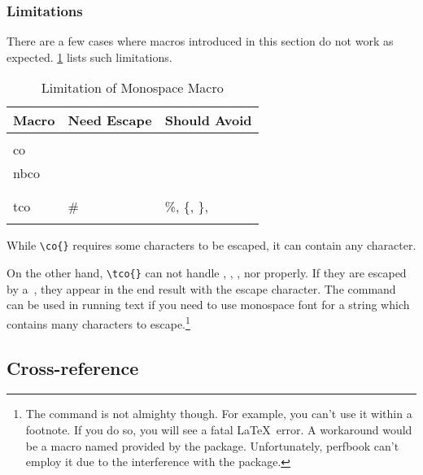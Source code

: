 \subsubsection{Limitations}
\label{sec:app:styleguide:Limitations}

There are a few cases where macros introduced in this section
do not work as expected.
\cref{tab:app:styleguide:Limitation of Monospace Macro}
lists such limitations.

\begin{table}[tbh]
\renewcommand*{\arraystretch}{1.2}\centering\footnotesize
\begin{tabular}{@{}lll@{}}\toprule
  Macro &  Need Escape & Should Avoid \\
  \midrule
  \co{\\co}, \co{\\nbco} & \co{\\}, \%, \{, \} & \\
  \co{\\tco}  & \# & \%, \{, \}, \co{\\} \\
  \bottomrule
\end{tabular}
\caption{Limitation of Monospace Macro}
\label{tab:app:styleguide:Limitation of Monospace Macro}
\end{table}

While \verb|\co{}| requires some characters to be escaped,
it can contain any character.

On the other hand, \verb|\tco{}| can not handle
\qco{\%}, \qco{\{}, \qco{\}}, nor \qco{\\} properly.
If they are escaped by a~\qco{\\},
they appear in the end result with the escape character.
The \qco{\\verb} command can be used in running text if you
need to use monospace font for a string which contains
many characters to escape.\footnote{
  The \co{\\verb} command is not almighty though.
  For example, you can't use it within a footnote.
  If you do so, you will see a fatal \LaTeX\ error.
  A workaround would be a macro named \co{\\VerbatimFootnotes}
  provided by the  package.
  Unfortunately, perfbook can't employ it due to the interference
  with the  package.
  }

\subsection{Cross-reference}
\label{sec:app:styleguide:Cross-Reference}

